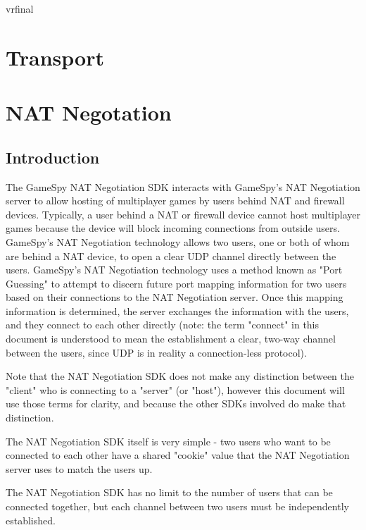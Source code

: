 \documentclass[oneside,titlepage,a4paper]{Definition/retrospy} %
\begin{document}
\ServerResponse
\begin{mybox}
	\tbs vr\tbs<valid value>\tbs final\tbs
\end{mybox}



\part{Transport}






\part{NAT Negotation}

\chapter{Introduction}
The GameSpy NAT Negotiation SDK interacts with GameSpy's NAT Negotiation server to allow hosting of multiplayer games by users behind NAT and firewall devices. Typically, a user behind a NAT or firewall device cannot host multiplayer games because the device will block incoming connections from outside users. GameSpy's NAT Negotiation technology allows two users, one or both of whom are behind a NAT device, to open a clear UDP channel directly between the users.
GameSpy's NAT Negotiation technology uses a method known as "Port Guessing" to attempt to discern future port mapping information for two users based on their connections to the NAT Negotiation server. Once this mapping information is determined, the server exchanges the information with the users, and they connect to each other directly (note: the term "connect" in this document is understood to mean the establishment a clear, two-way channel between the users, since UDP is in reality a connection-less protocol).

Note that the NAT Negotiation SDK does not make any distinction between the "client" who is connecting to a "server" (or "host"), however this document will use those terms for clarity, and because the other SDKs involved do make that distinction.

The NAT Negotiation SDK itself is very simple - two users who want to be connected to each other have a shared "cookie" value that the NAT Negotiation server uses to match the users up. 

The NAT Negotiation SDK has no limit to the number of users that can be connected together, but each channel between two users must be independently established.
\end{document}
